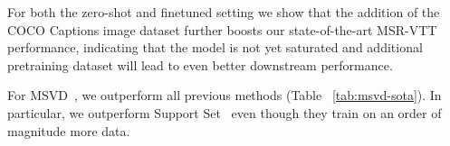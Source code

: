 For both the zero-shot and finetuned setting we show that the addition of the COCO Captions image dataset further boosts our state-of-the-art MSR-VTT performance, indicating that the model is not yet saturated and additional pretraining dataset will lead to even better downstream performance.

For MSVD~\cite{chen2011collecting}, we outperform all previous methods (Table ~\ref{tab:msvd-sota}). In particular, we outperform Support Set~\cite{patrick2020support} even though they train on an order of magnitude more data.
\begin{table}
\centering
\caption{Text-to-video retrieval results on the MSVD~\cite{chen2011collecting} test set.}
\label{tab:msvd-sota}
\end{table} 

